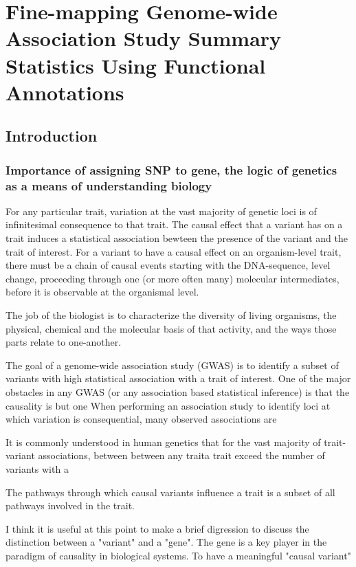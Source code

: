 \chapter{Fine-mapping Genome-wide Association Study Summary Statistics Using Functional Annotations}

\section{Introduction}\label{sec:org59556ac}

\subsection{Importance of assigning SNP to gene, the logic of genetics as a means of understanding biology}\label{sec:org1481578}

For any particular trait, variation at the vast majority of genetic loci is of infinitesimal consequence to that trait.  The causal
effect that a variant has on a trait induces a statistical association bewteen the presence of the variant and the trait of interest.
For a variant to have a causal effect on an organism-level trait, there must be a chain of causal events starting with the DNA-sequence,
 level change, proceeding through one (or more often many) molecular intermediates, before it is observable at the organismal level.  

The job of the biologist is to characterize the diversity of living organisms, the physical, chemical and the molecular basis of that activity, and the ways
 those parts relate to one-another.


 The goal of a genome-wide association study (GWAS) is to identify a subset of variants with high statistical association with a trait of interest.
One of the major obstacles in any GWAS (or any association based statistical inference) is that the causality is but one   When
performing an association study to identify loci at which variation is consequential, many observed associations are 

It is commonly understood in human genetics that for the vast majority of trait-variant associations, 
 between between any traita trait exceed the number of variants with a 

The pathways through which causal variants influence a trait is a subset of all pathways involved in the trait.  


I think it is useful at this point to make a brief digression to discuss the distinction between a "variant" and a "gene". The gene
is a key player in the paradigm of causality in biological systems. To have a meaningful "causal variant"

